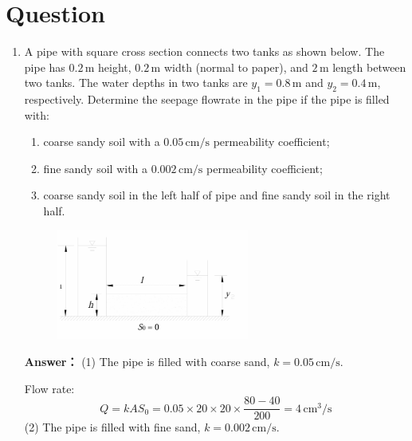 \documentclass[12pt,a4paper]{article}
\newcounter{question}
\newenvironment{questions}{
    \setcounter{question}{0}
    \section*{Question}
    \begin{enumerate}[leftmargin=1.5em,label={\arabic*．}]
}{
    \end{enumerate}
}
\newcommand{\answer}[1]{\par\noindent\textbf{Answer：} #1\par\vspace{1em}}
\begin{document}
\begin{questions}
{{Consider contraction and energy loss coefficients:
\begin{itemize}
  \item \(\sigma\): energy loss coefficient, \( \sigma \leq 1.0 \).
  \item \(\epsilon\): contraction coefficient, \( \epsilon \leq 1.0 \).
  \[
  C'_{w} = \sigma \epsilon C_w
  \]
\end{itemize}
Sometimes, \( C'_{w} \) is replaced by \( m \), called the discharge coefficient. Then
\[
Q = \epsilon \sigma m_0 b \sqrt{2g} H^{3/2}
\]

}
}

\item A pipe with square cross section connects two tanks as shown below. The pipe has $0.2\,\mathrm{m}$ height, $0.2\,\mathrm{m}$ width (normal to paper), and $2\,\mathrm{m}$ length between two tanks. The water depths in two tanks are $y_1 = 0.8\,\mathrm{m}$ and $y_2 = 0.4\,\mathrm{m}$, respectively. Determine the seepage flowrate in the pipe if the pipe is filled with: 
\begin{enumerate}
  \item coarse sandy soil with a $0.05\,\mathrm{cm/s}$ permeability coefficient;
  \item fine sandy soil with a $0.002\,\mathrm{cm/s}$ permeability coefficient;
  \item coarse sandy soil in the left half of pipe and fine sandy soil in the right half.
\end{enumerate}

\begin{figure}[H]
\centering
\includegraphics[width=0.6\textwidth]{./figures/34.png}
\end{figure}

\answer{
(1) The pipe is filled with coarse sand, \( k = 0.05 \, \mathrm{cm/s} \).

Flow rate:
\[
Q = k A S_0 = 0.05 \times 20 \times 20 \times \frac{80 - 40}{200} = 4 \, \mathrm{cm}^3/\mathrm{s}
\]
(2) The pipe is filled with fine sand, \( k = 0.002 \, \mathrm{cm/s} \).

}
\end{questions}
\end{document}
